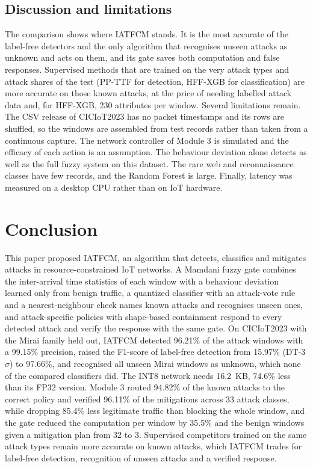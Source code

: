 \documentclass[]{interact}
\theoremstyle{plain}
\theoremstyle{definition}
\begin{document}
\subsection{Discussion and limitations}
The comparison shows where IATFCM stands. It is the most accurate of the label-free detectors and the only algorithm that recognises unseen attacks as unknown and acts on them, and its gate saves both computation and false responses. Supervised methods that are trained on the very attack types and attack shares of the test (PP-TTF for detection, HFF-XGB for classification) are more accurate on those known attacks, at the price of needing labelled attack data and, for HFF-XGB, 230 attributes per window. Several limitations remain. The CSV release of CICIoT2023 has no packet timestamps and its rows are shuffled, so the windows are assembled from test records rather than taken from a continuous capture. The network controller of Module 3 is simulated and the efficacy of each action is an assumption. The behaviour deviation alone detects as well as the full fuzzy system on this dataset. The rare web and reconnaissance classes have few records, and the Random Forest is large. Finally, latency was measured on a desktop CPU rather than on IoT hardware.


\section{Conclusion}\label{sec:conclusion}
This paper proposed IATFCM, an algorithm that detects, classifies and mitigates attacks in resource-constrained IoT networks. A Mamdani fuzzy gate combines the inter-arrival time statistics of each window with a behaviour deviation learned only from benign traffic, a quantized classifier with an attack-vote rule and a nearest-neighbour check names known attacks and recognises unseen ones, and attack-specific policies with shape-based containment respond to every detected attack and verify the response with the same gate. On CICIoT2023 with the Mirai family held out, IATFCM detected 96.21\% of the attack windows with a 99.15\% precision, raised the F1-score of label-free detection from 15.97\% (DT-3$\sigma$) to 97.66\%, and recognised all unseen Mirai windows as unknown, which none of the compared classifiers did. The INT8 network needs 16.2~KB, 74.6\% less than its FP32 version. Module 3 routed 94.82\% of the known attacks to the correct policy and verified 96.11\% of the mitigations across 33 attack classes, while dropping 85.4\% less legitimate traffic than blocking the whole window, and the gate reduced the computation per window by 35.5\% and the benign windows given a mitigation plan from 32 to 3. Supervised competitors trained on the same attack types remain more accurate on known attacks, which IATFCM trades for label-free detection, recognition of unseen attacks and a verified response.
\end{document}
